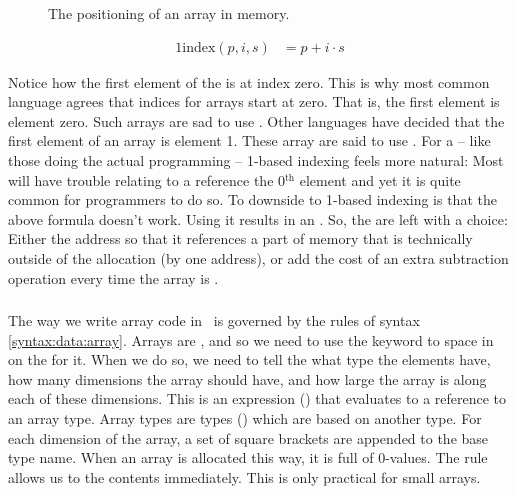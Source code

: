 \begin{figure}[tbp]
  
  \caption{The positioning of an array in memory.}
  \label{fig:data:array:alloc}
\end{figure}

\begin{alignat*}{1}
  \mathrm{index}(p,i,s) &= p + i \cdot s
\end{alignat*}

Notice how the first element of the  is at index zero. This is why most common language agrees that indices for arrays start at zero. That is, the first element is element zero. Such arrays are sad to use . Other languages have decided that the first element of an array is element 1. These array are said to use . For a  -- like those doing the actual programming -- 1-based indexing feels more natural: Most  will have trouble relating to a reference the 0$^\mathrm{th}$ element and yet it is quite common for programmers to do so. To downside to 1-based indexing is that the above formula doesn't work. Using it results in an . So, the  are left with a choice: Either  the address so that it references a part of memory that is technically outside of the allocation (by one address), or add the cost of an extra subtraction operation every time the array is .

\subsubsection{\csharp}

The way we write array code in \csharp\ is governed by the rules of syntax \ref{syntax:data:array}. Arrays are , and so we need to use the  keyword to  space in  on the  for it. When we do so, we need to tell the  what type the elements have, how many dimensions the array should have, and how large the array is along each of these dimensions. This is an expression () that evaluates to a reference to an array type. Array types are types () which are based on another type. For each dimension of the array, a set of square brackets are appended to the base type name. When an array is allocated this way, it is full of 0-values. The  rule allows us to  the contents immediately. This is only practical for small arrays.

